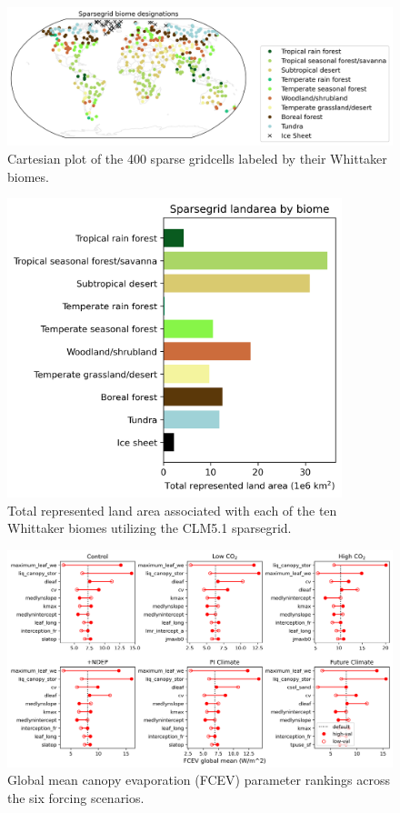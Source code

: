 \documentclass[11pt]{article}
\begin{document}
\begin{figure}[h]
\centering
\includegraphics[width=40pc]{../figs/supp/biome_latlon.png}
\caption{Cartesian plot of the 400 sparse gridcells labeled by their Whittaker biomes.}
\label{supp:whit2}
\end{figure}


\begin{figure}[h]
\centering
\includegraphics[width=23pc]{../figs/supp/biome_areas.png}
\caption{Total represented land area associated with each of the ten Whittaker biomes utilizing the CLM5.1 sparsegrid.}
\label{supp:whit3}
\end{figure}




\begin{figure}[h]
\centering
\includegraphics[width=\textwidth]{../figs/supp/FCEV_global_mean.png}
\caption{Global mean canopy evaporation (FCEV) parameter rankings across the six forcing scenarios.}
\label{supp:fcev}
\end{figure}
\end{document}
